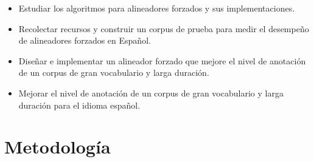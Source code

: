 \begin{itemize}
    \item Estudiar los algoritmos para alineadores forzados y sus implementaciones.
    \item Recolectar recursos y construir un corpus de prueba para medir el desempeño de alineadores forzados en Español.
    \item Diseñar e implementar un alineador forzado que mejore el nivel de anotación de un corpus de gran vocabulario y larga duración.
    \item Mejorar el nivel de anotación de un corpus de gran vocabulario y larga duración para el idioma español.

\end{itemize}



\section{Metodología}

